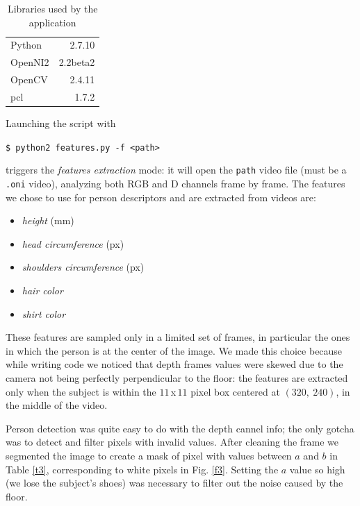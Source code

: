 \documentclass[letterpaper, 11pt, conference]{ieeeconf} %
\begin{document}
\begin{table}[t]
\centering
\begin{tabular}{lr}
	Python & 2.7.10\\
	OpenNI2 & 2.2beta2\\
	OpenCV & 2.4.11\\
	pcl & 1.7.2\\
\end{tabular}
\caption{Libraries used by the application} \label{t2}
\vspace{-1em}
\end{table}

Launching the script with

\begin{center}
\texttt{\$ python2 features.py -f <path>}
\end{center}

triggers the \emph{features extraction} mode: it will open the \texttt{path} video file (must be a \texttt{.oni} video), analyzing both RGB and D channels frame by frame. The features we chose to use for person descriptors and are extracted from videos are:

\begin{itemize}
\item{\emph{height} (mm)}
\item{\emph{head circumference} (px)}
\item{\emph{shoulders circumference} (px)}
\item{\emph{hair color}}
\item{\emph{shirt color}}
\end{itemize}

These features are sampled only in a limited set of frames, in particular the ones in which the person is at the center of the image. We made this choice because while writing code we noticed that depth frames values were skewed due to the camera not being perfectly perpendicular to the floor: the features are extracted only when the subject is within the $11\,$x$\,11$ pixel box centered at $(320,~240)$, in the middle of the video.

Person detection was quite easy to do with the depth cannel info; the only gotcha was to detect and filter pixels with invalid values. After cleaning the frame we segmented the image to create a mask of pixel with values between $a$ and $b$ in Table \ref{t3}, corresponding to white pixels in Fig. \ref{f3}. Setting the $a$ value so high (we lose the subject's shoes) was necessary to filter out the noise caused by the floor.
\end{document}
